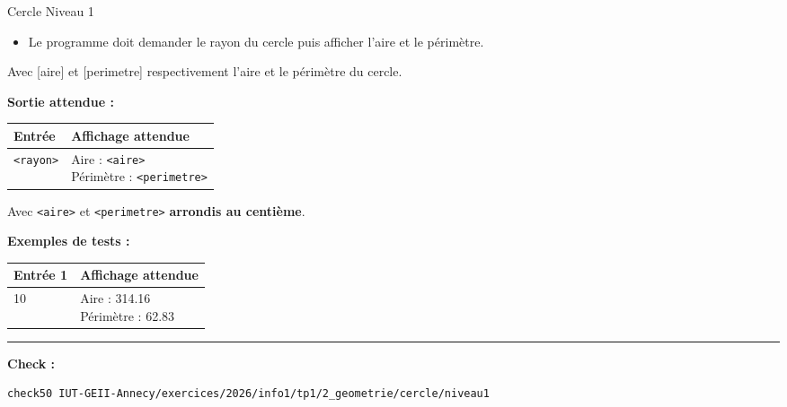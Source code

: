 \begin{UPSTIcahierDesCharges}{Cercle Niveau 1}
	\begin{itemize}
		\item Le programme doit demander le rayon du cercle puis afficher l'aire et le périmètre.
	\end{itemize}

	Avec [aire] et [perimetre] respectivement l'aire et le périmètre du cercle.

	\textbf{Sortie attendue :}
	\begin{center}
		\begin{tabular}{|l|l|}
			\hline
			Entrée           & Affichage attendue                   \\
			\hline
			\texttt{<rayon>} & \makecell[tl]{Aire : \texttt{<aire>} \\Périmètre : \texttt{<perimetre>}} \\
			\hline
		\end{tabular}
	\end{center}
	Avec \texttt{<aire>} et \texttt{<perimetre>} \textbf{arrondis au centième}.

	\textbf{Exemples de tests :}
	\begin{center}
		\begin{tabular}{|l|l|}
			\hline
			Entrée 1 & Affichage attendue          \\
			\hline
			10       & \makecell[tl]{Aire : 314.16 \\Périmètre : 62.83} \\
			\hline
		\end{tabular}
	\end{center}
	\hrule
	\textbf{Check :}
	\begin{lstlisting}[language=bash,style=console]
check50 IUT-GEII-Annecy/exercices/2026/info1/tp1/2_geometrie/cercle/niveau1
\end{lstlisting}
\end{UPSTIcahierDesCharges}






